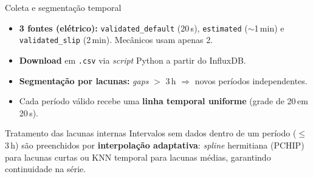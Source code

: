 \documentclass{beamer}
\begin{document}
\begin{frame}{Coleta e segmentação temporal}
    \begin{itemize}
        \item \textbf{3 fontes (elétrico):} \texttt{validated\_default} (20\,s), \texttt{estimated} ($\sim$1\,min) e \texttt{validated\_slip} (2\,min). Mecânicos usam apenas 2.
        \item \textbf{Download} em \texttt{.csv} via \textit{script} Python a partir do InfluxDB.
        \item \textbf{Segmentação por lacunas:} \textit{gaps} $>$ 3\,h $\Rightarrow$ novos períodos independentes.
        \item Cada período válido recebe uma \textbf{linha temporal uniforme} (grade de 20\,em\,20\,s).
    \end{itemize}
    \vspace{0.2cm}
    \begin{block}{Tratamento das lacunas internas}
        Intervalos sem dados dentro de um período ($\leq$ 3\,h) são preenchidos por \textbf{interpolação adaptativa}: \textit{spline} hermitiana (PCHIP) para lacunas curtas ou KNN temporal para lacunas médias, garantindo continuidade na série.
    \end{block}
\end{frame}
\end{document}
